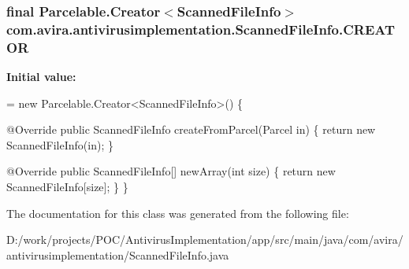 \subsubsection[{C\+R\+E\+A\+T\+O\+R}]{\setlength{\rightskip}{0pt plus 5cm}final Parcelable.\+Creator$<${\bf Scanned\+File\+Info}$>$ com.\+avira.\+antivirusimplementation.\+Scanned\+File\+Info.\+C\+R\+E\+A\+T\+O\+R\hspace{0.3cm}{\ttfamily [static]}}\label{classcom_1_1avira_1_1antivirusimplementation_1_1_scanned_file_info_a90fc22d7a56a56737a77cad7a6d0bc98}
{\bfseries Initial value\+:}
\begin{DoxyCode}
= \textcolor{keyword}{new} Parcelable.Creator<ScannedFileInfo>() \{
        
        @Override
        \textcolor{keyword}{public} ScannedFileInfo createFromParcel(Parcel in) \{
            \textcolor{keywordflow}{return} \textcolor{keyword}{new} ScannedFileInfo(in);
        \}

        
        @Override
        \textcolor{keyword}{public} ScannedFileInfo[] newArray(\textcolor{keywordtype}{int} size) \{
            \textcolor{keywordflow}{return} \textcolor{keyword}{new} ScannedFileInfo[size];
        \}
    \}
\end{DoxyCode}


The documentation for this class was generated from the following file\+:\begin{DoxyCompactItemize}
\item 
D\+:/work/projects/\+P\+O\+C/\+Antivirus\+Implementation/app/src/main/java/com/avira/antivirusimplementation/Scanned\+File\+Info.\+java\end{DoxyCompactItemize}

